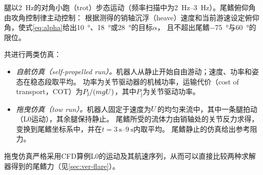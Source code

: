 腿以\SI{2}{\hertz}的对角小跑（trot）步态运动（频率扫描中为\SIrange{2}{3}{\hertz}）。尾鳍俯仰角由攻角控制律主动控制：
根据测得的销轴沉浮（heave）速度和当前游速设定俯仰角，使式\eqref{eq:alpha}给出\SI{10}{\degree}、\SI{18}{\degree}或\SI{28}{\degree}的目标$\alpha$，
且不超出尾鳍\SI{-75}{\degree}与\SI{+60}{\degree}的限位。

共进行两类仿真：
\begin{itemize}
  \item \emph{自航仿真（self-propelled run）。}机器人从静止开始自由游动；速度、功率和姿态在稳态段取平均。
        功率为关节驱动器的机械功率，运输代价（cost of transport，COT）为$P_\text{j}/(mgU)$，其中$P_\text{j}$为关节驱动功率。
  \item \emph{拖曳仿真（tow run）。}机器人固定于速度为$U$的均匀来流中，其中一条腿拍动（L0运动），其余腿保持静止。
        尾鳍所受的流体力由销轴处的关节反力求得，变换到尾鳍坐标系中，并在$t=\SIrange{3}{9}{\second}$内取平均。
        尾鳍静止的仿真给出参考阻力。
\end{itemize}
拖曳仿真严格采用CFD算例L0的运动及其航速序列，从而可以直接比较两种求解器得到的尾鳍力（见\cref{sec:ver-flare}）。
